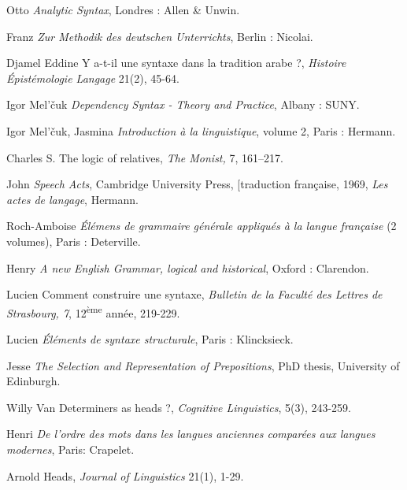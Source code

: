 {    Otto \citet{Jespersen1937} \textit{Analytic Syntax}, Londres : Allen \& Unwin.

    Franz \citet{Kern1883} \textit{Zur Methodik des deutschen Unterrichts}, Berlin : Nicolai.

    Djamel Eddine \citet{Kouloughli1999} Y a-t-il une syntaxe dans la tradition arabe ?, \textit{Histoire Épistémologie Langage} 21(2), 45-64.

    Igor Mel’čuk  \textit{Dependency Syntax - Theory and Practice}, Albany : SUNY.

    Igor Mel’čuk, Jasmina \citet{Milićević2014} \textit{Introduction à la linguistique}, volume 2, Paris : Hermann.

    Charles S. \citet{Peirce1897} The logic of relatives, \textit{The Monist,} 7, 161–217.

    John \citet{Searle1969} \textit{Speech Acts}, Cambridge University Press, [traduction française, 1969, \textit{Les actes de langage}, Hermann.

    Roch-Amboise \citet{Sicard1801} \textit{Élémens de grammaire générale appliqués à la langue française} (2 volumes), Paris : Deterville.

    Henry \citet{Sweet1891} \textit{A new English Grammar, logical and historical}, Oxford : Clarendon.

    Lucien \citet{Tesnière1934} Comment construire une syntaxe, \textit{Bulletin de la Faculté des Lettres de Strasbourg, 7}, 12\textsuperscript{ème} année, 219-229.

    Lucien \citet{Tesnière1959} \textit{Éléments de syntaxe structurale}, Paris : Klincksieck.

    Jesse \citet{Tseng2001} \textit{The Selection and Representation of Prepositions}, PhD thesis, University of Edinburgh.

    Willy Van \citet{Langendonck1994} Determiners as heads ?, \textit{Cognitive Linguistics}, 5(3), 243-259.

    Henri \citet{Weil1844} \textit{De l’ordre des mots dans les langues anciennes comparées aux langues modernes}, Paris: Crapelet.

    Arnold \citet{Zwicky1985} Heads, \textit{Journal of Linguistics} 21(1), 1-29.
}
